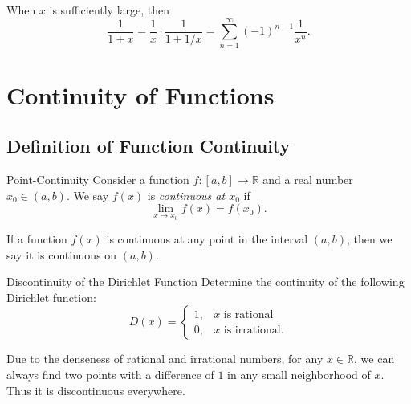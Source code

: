 \begin{note}
  When $x$ is sufficiently large, then
  \begin{equation}
    \frac{1}{1+x} = \frac{1}{x} \cdot \frac{1}{1 + 1/x}
    = \sum\limits_{n = 1}^{\infty} (-1)^{n-1} \frac{1}{x^n}.
  \end{equation}
\end{note}


\section{Continuity of Functions}

\subsection{Definition of Function Continuity}

\begin{definition}{Point-Continuity}{}
  Consider a function $f: [a, b] \rightarrow \mathbb{R}$
  and a real number $x_0 \in (a, b)$.
  We say $f(x)$ is \emph{continuous at $x_0$} if
  \begin{equation}
    \lim \limits _{x \rightarrow x_0} f(x) = f(x_0).
  \end{equation}
\end{definition}

\begin{note}
  If a function $f(x)$ is continuous at any point in the interval $(a, b)$,
  then we say it is continuous on $(a, b)$.
\end{note}

\begin{example}{Discontinuity of the Dirichlet Function}{}
  Determine the continuity of the following Dirichlet function:
  \begin{equation}
    D(x) =
    \begin{cases}
      1, & x \text{ is rational}\\
      0, & x \text{ is irrational}.
    \end{cases}
  \end{equation}
\end{example}

\begin{solution}
  Due to the denseness of rational and irrational numbers,
  for any $x \in \mathbb{R}$,
  we can always find two points with a difference of $1$ in any small neighborhood of
  $x$.
  Thus it is discontinuous everywhere.
\end{solution}

